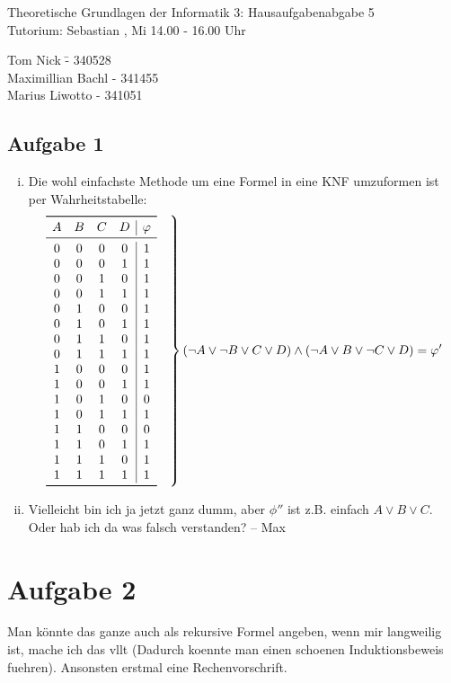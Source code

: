 \documentclass[a4paper,10pt]{article}
\begin{document}
\begin{center}
\Large{Theoretische Grundlagen der Informatik 3: Hausaufgabenabgabe 5} \\
\large{Tutorium: Sebastian , Mi 14.00 - 16.00 Uhr}
\end{center}
\begin{tabbing}
Tom Nick \hspace{2cm}\= - 340528\\
Maximillian Bachl \> - 341455 \\
Marius Liwotto\> -  341051
\end{tabbing}
\subsection*{Aufgabe 1}
\begin{enumerate}[(i)]
\item 	Die wohl einfachste Methode um eine Formel in eine KNF umzuformen ist per Wahrheitstabelle:
	\[
	\left.\begin{array}{cccc|c}
		\toprule 
		A & B & C & D & \varphi\\
		\midrule
		0 & 0 & 0 & 0 & 1\\
		0 & 0 & 0 & 1 & 1\\
		0 & 0 & 1 & 0 & 1\\
		0 & 0 & 1 & 1 & 1\\
		0 & 1 & 0 & 0 & 1\\
		0 & 1 & 0 & 1 & 1\\
		0 & 1 & 1 & 0 & 1\\
		0 & 1 & 1 & 1 & 1\\
		1 & 0 & 0 & 0 & 1\\
		1 & 0 & 0 & 1 & 1\\
		1 & 0 & 1 & 0 & 0\\
		1 & 0 & 1 & 1 & 1\\
		1 & 1 & 0 & 0 & 0\\
		1 & 1 & 0 & 1 & 1\\
		1 & 1 & 1 & 0 & 1\\
		1 & 1 & 1 & 1 & 1\\
		\bottomrule
		\end{array} \quad \right\} ( \lnot A \lor  \lnot B \lor C \lor D) \land (\lnot A \lor B \lor \lnot C \lor D) = \varphi'
	 \]
\item
	Vielleicht bin ich ja jetzt ganz dumm, aber $\phi''$ ist z.B. einfach $A \lor B \lor C$. Oder hab ich da was falsch verstanden? -- Max
 \end{enumerate}
\section*{Aufgabe 2}
	Man könnte das ganze auch als rekursive Formel angeben, wenn mir langweilig ist, 		mache ich das vllt (Dadurch koennte man einen schoenen Induktionsbeweis fuehren). 
	Ansonsten erstmal eine Rechenvorschrift.
\end{document}
